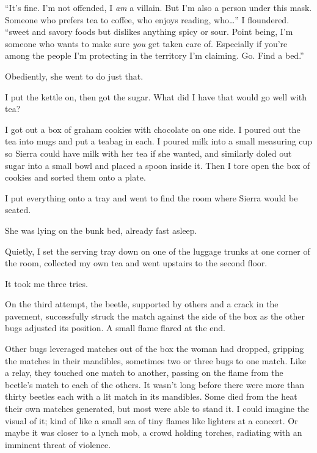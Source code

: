 ``It's fine.  I'm not offended, I \emph{am} a villain.  But I'm also a person under this mask.  Someone who prefers tea to coffee, who enjoys reading, who\ldots''  I floundered.  ``\ldotslikes sweet and savory foods but dislikes anything spicy or sour.  Point being, I'm someone who wants to make sure \emph{you} get taken care of.  Especially if you're among the people I'm protecting in the territory I'm claiming.  Go.  Find a bed.''



Obediently, she went to do just that.



I put the kettle on, then got the sugar.  What did I have that would go well with tea?



I got out a box of graham cookies with chocolate on one side.  I poured out the tea into mugs and put a teabag in each.  I poured milk into a small measuring cup so Sierra could have milk with her tea if she wanted, and similarly doled out sugar into a small bowl and placed a spoon inside it.  Then I tore open the box of cookies and sorted them onto a plate.



I put everything onto a tray and went to find the room where Sierra would be seated.



She was lying on the bunk bed, already fast asleep.



Quietly, I set the serving tray down on one of the luggage trunks at one corner of the room, collected my own tea and went upstairs to the second floor.



\sectionbreak



It took me three tries.



On the third attempt, the beetle, supported by others and a crack in the pavement, successfully struck the match against the side of the box as the other bugs adjusted its position.  A small flame flared at the end.



Other bugs leveraged matches out of the box the woman had dropped, gripping the matches in their mandibles, sometimes two or three bugs to one match.  Like a relay, they touched one match to another, passing on the flame from the beetle's match to each of the others.  It wasn't long before there were more than thirty beetles each with a lit match in its mandibles.  Some died from the heat their own matches generated, but most were able to stand it.  I could imagine the visual of it; kind of like a small sea of tiny flames like lighters at a concert.  Or maybe it was closer to a lynch mob, a crowd holding torches, radiating with an imminent threat of violence.



